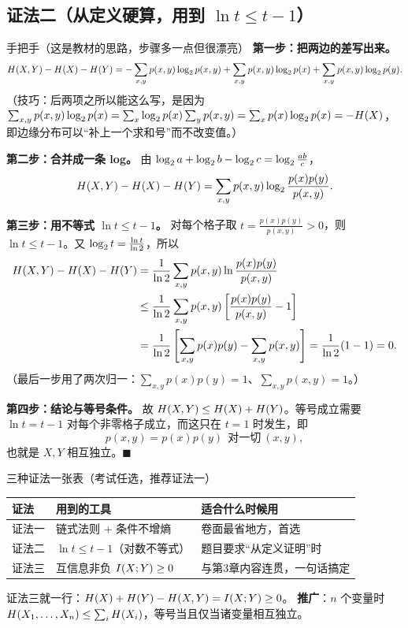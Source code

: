 \documentclass[11pt,a4paper]{ctexart}
\begin{document}
\subsection*{证法二（从定义硬算，用到 $\ln t\le t-1$）}
\begin{calc}{手把手（这是教材的思路，步骤多一点但很漂亮）}
\textbf{第一步：把两边的差写出来。}
\[
H\!\left(X,Y\right)-H\!\left(X\right)-H\!\left(Y\right)
=-\sum_{x,y}p(x,y)\log_{2} p(x,y)+\sum_{x,y}p(x,y)\log_{2} p(x)+\sum_{x,y}p(x,y)\log_{2} p(y).
\]
（技巧：后两项之所以能这么写，是因为
$\sum_{x,y}p(x,y)\log_{2} p(x)=\sum_x\log_{2} p(x)\sum_y p(x,y)=\sum_x p(x)\log_{2} p(x)=-H\!\left(X\right)$，
即边缘分布可以“补上一个求和号”而不改变值。）

\textbf{第二步：合并成一条 log。} 由 $\log_{2} a+\log_{2} b-\log_{2} c=\log_{2}\frac{ab}{c}$，
\[
H\!\left(X,Y\right)-H\!\left(X\right)-H\!\left(Y\right)=\sum_{x,y}p(x,y)\log_{2}\frac{p(x)p(y)}{p(x,y)} .
\]

\textbf{第三步：用不等式 $\ln t\le t-1$。}
对每个格子取 $t=\frac{p(x)p(y)}{p(x,y)}>0$，则 $\ln t\le t-1$。又 $\log_{2} t=\frac{\ln t}{\ln2}$，所以
\begin{align*}
H\!\left(X,Y\right)-H\!\left(X\right)-H\!\left(Y\right)
&=\frac{1}{\ln2}\sum_{x,y}p(x,y)\ln\frac{p(x)p(y)}{p(x,y)}\\
&\le\frac{1}{\ln2}\sum_{x,y}p(x,y)\left[\frac{p(x)p(y)}{p(x,y)}-1\right]\\
&=\frac{1}{\ln2}\left[\sum_{x,y}p(x)p(y)-\sum_{x,y}p(x,y)\right]
=\frac{1}{\ln2}(1-1)=0 .
\end{align*}
（最后一步用了两次归一：$\sum_{x,y}p(x)p(y)=1$、$\sum_{x,y}p(x,y)=1$。）

\textbf{第四步：结论与等号条件。}
故 $H\!\left(X,Y\right)\le H\!\left(X\right)+H\!\left(Y\right)$。等号成立需要 $\ln t=t-1$ 对每个非零格子成立，而这只在 $t=1$ 时发生，即
\[
p(x,y)=p(x)p(y)\ \ \text{对一切}\ (x,y),
\]
也就是 $X,Y$ 相互独立。$\blacksquare$
\end{calc}

\begin{idea}{三种证法一张表（考试任选，推荐证法一）}
\begin{center}
\renewcommand{\arraystretch}{1.3}
\begin{tabular}{l|l|l}
\toprule
证法 & 用到的工具 & 适合什么时候用\\
\midrule
证法一 & 链式法则 + 条件不增熵 & 卷面最省地方，首选\\
证法二 & $\ln t\le t-1$（对数不等式） & 题目要求“从定义证明”时\\
证法三 & 互信息非负 $I\!\left(X;Y\right)\ge0$ & 与第3章内容连贯，一句话搞定\\
\bottomrule
\end{tabular}
\end{center}
证法三就一行：$H\!\left(X\right)+H\!\left(Y\right)-H\!\left(X,Y\right)=I\!\left(X;Y\right)\ge0$。
\textbf{推广}：$n$ 个变量时 $H\!\left(X_1,\dots,X_n\right)\le\sum_iH\!\left(X_i\right)$，等号当且仅当诸变量相互独立。
\end{idea}
\end{document}
